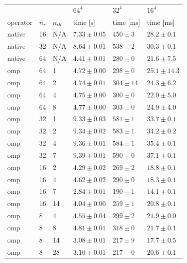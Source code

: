 \documentclass{article}
\theoremstyle{plain} %
\theoremstyle{convention} %
\theoremstyle{remark} %
\numberwithin{equation}{section}
\begin{document}
\begin{table}
    \centering
    \begin{tabular}{ |p{1.5cm}||p{1cm}|p{1cm}|p{2cm}|p{2cm}|p{2cm}| }
        \hline
        & & & $64^4$ & $32^4$ & $16^4$ \\
        operator & $n_r$ & $n_{th}$ & time [s] & time [ms] & time [ms] \\
        \hline
        native & 16 & N/A & $7.33 \pm 0.05$ & $450 \pm 3$ & $28.2 \pm 0.1$ \\
        native & 32 & N/A & $8.64 \pm 0.01$ & $538 \pm 2$ & $30.3 \pm 0.1$ \\
        native & 64 & N/A & $4.41 \pm 0.01$ & $280 \pm 0$ & $21.6 \pm 7.5$ \\
        \hline
        omp & 64 & 1 & $4.72 \pm 0.00$ & $298 \pm 0$ & $25.1 \pm 14.3$ \\
        omp & 64 & 2 & $4.74 \pm 0.01$ & $304 \pm 14$ & $24.3 \pm 6.2$ \\
        omp & 64 & 4 & $4.75 \pm 0.00$ & $300 \pm 0$ & $22.0 \pm 5.0$ \\
        omp & 64 & 8 & $4.77 \pm 0.00$ & $303 \pm 0$ & $24.9 \pm 4.0$ \\
        \hline
        omp & 32 & 1 & $9.33 \pm 0.03$ & $581 \pm 1$ & $33.7 \pm 0.1$ \\
        omp & 32 & 2 & $9.34 \pm 0.02$ & $583 \pm 1$ & $34.2 \pm 0.2$ \\
        omp & 32 & 4 & $9.36 \pm 0.01$ & $584 \pm 1$ & $35.4 \pm 0.1$ \\
        omp & 32 & 7 & $9.39 \pm 0.01$ & $590 \pm 0$ & $37.1 \pm 0.1$ \\
        \hline
        omp & 16 & 2 & $4.29 \pm 0.02$ & $269 \pm 2$ & $18.8 \pm 0.1$ \\
        omp & 16 & 4 & $4.62 \pm 0.02$ & $290 \pm 0$ & $18.3 \pm 0.1$ \\
        omp & 16 & 7 & $2.84 \pm 0.01$ & $190 \pm 1$ & $14.1 \pm 0.1$ \\
        omp & 16 & 14 & $4.04 \pm 0.00$ & $259 \pm 1$ & $20.8 \pm 0.1$ \\
        \hline
        omp & 8 & 4 & $4.55 \pm 0.04$ & $299 \pm 2$ & $21.9 \pm 0.0$ \\
        omp & 8 & 8 & $4.81 \pm 0.01$ & $318 \pm 0$ & $21.7 \pm 0.1$ \\
        omp & 8 & 14 & $3.08 \pm 0.01$ & $217 \pm 9$ & $17.7 \pm 0.5$ \\
        omp & 8 & 28 & $3.10 \pm 0.01$ & $217 \pm 0$ & $20.6 \pm 0.1$ \\

\end{tabular}
\end{table}
\end{document}

